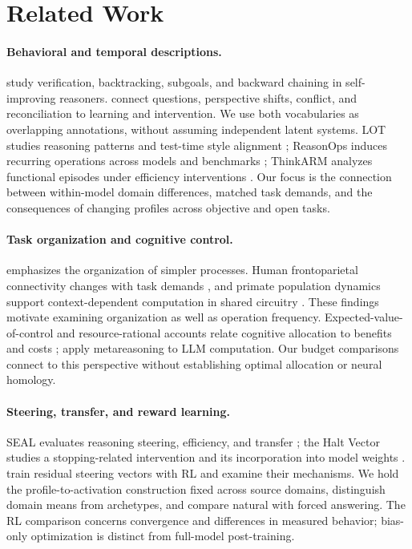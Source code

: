 \section{Related Work}
\paragraph{Behavioral and temporal descriptions.}
\citet{gandhi2025habits} study verification, backtracking, subgoals, and backward chaining in self-improving reasoners. \citet{kim2026society} connect questions, perspective shifts, conflict, and reconciliation to learning and intervention. We use both vocabularies as overlapping annotations, without assuming independent latent systems. LOT studies reasoning patterns and test-time style alignment \citep{chen2025lot}; ReasonOps induces recurring operations across models and benchmarks \citep{lee2026reasonops}; ThinkARM analyzes functional episodes under efficiency interventions \citep{li2025thinkarm}. Our focus is the connection between within-model domain differences, matched task demands, and the consequences of changing profiles across objective and open tasks.

\paragraph{Task organization and cognitive control.}
\citet{minsky1986society} emphasizes the organization of simpler processes. Human frontoparietal connectivity changes with task demands \citep{cole2013hubs}, and primate population dynamics support context-dependent computation in shared circuitry \citep{mante2013context}. These findings motivate examining organization as well as operation frequency. Expected-value-of-control and resource-rational accounts relate cognitive allocation to benefits and costs \citep{shenhav2013control,lieder2020resource}; \citet{desabbata2024metareasoning} apply metareasoning to LLM computation. Our budget comparisons connect to this perspective without establishing optimal allocation or neural homology.

\paragraph{Steering, transfer, and reward learning.}
SEAL evaluates reasoning steering, efficiency, and transfer \citep{chen2025seal}; the Halt Vector studies a stopping-related intervention and its incorporation into model weights \citep{jayabahu2026halt}. \citet{sinii2025vectors} train residual steering vectors with RL and examine their mechanisms. We hold the profile-to-activation construction fixed across source domains, distinguish domain means from archetypes, and compare natural with forced answering. The RL comparison concerns convergence and differences in measured behavior; bias-only optimization is distinct from full-model post-training.

